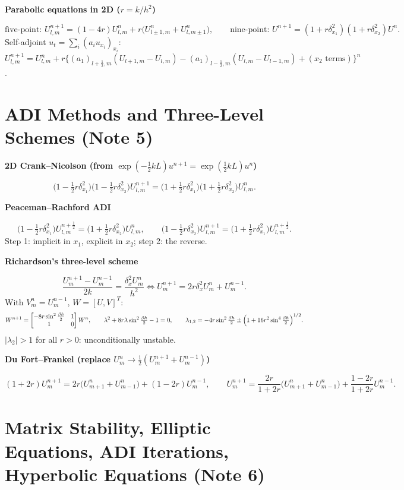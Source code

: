 \documentclass[10pt,a4paper]{article}
\newcommand{\head}[1]{\par\smallskip\noindent\textbf{\color{blue!50!black}#1}\par\nobreak}
\begin{document}
\head{Parabolic equations in 2D (\(r=k/h^2\))}
\[
  \text{five-point: } U_{l,m}^{n+1}=(1-4r)U_{l,m}^n+r\bigl(U_{l\pm1,m}^n+U_{l,m\pm1}^n\bigr),
  \qquad
  \text{nine-point: } U^{n+1}=(1+r\delta_{x_1}^2)(1+r\delta_{x_2}^2)U^n .
\]
Self-adjoint \(u_t=\sum_i(a_iu_{x_i})_{x_i}\):
\(U^{n+1}_{l,m}=U^n_{l,m}+r\bigl\{(a_1)_{l+\frac12,m}(U_{l+1,m}-U_{l,m})-(a_1)_{l-\frac12,m}(U_{l,m}-U_{l-1,m})+(x_2\text{ terms})\bigr\}^n\).

\section{ADI Methods and Three-Level Schemes (Note 5)}

\head{2D Crank--Nicolson (from \(\exp(-\frac12kL)u^{n+1}=\exp(\frac12kL)u^n\))}
\[
  \bigl(1-\tfrac12r\delta_{x_1}^2\bigr)\bigl(1-\tfrac12r\delta_{x_2}^2\bigr)U_{l,m}^{n+1}
  =\bigl(1+\tfrac12r\delta_{x_1}^2\bigr)\bigl(1+\tfrac12r\delta_{x_2}^2\bigr)U_{l,m}^n .
\]

\head{Peaceman--Rachford ADI}
\[
  \bigl(1-\tfrac12r\delta_{x_1}^2\bigr)U_{l,m}^{n+\frac12}=\bigl(1+\tfrac12r\delta_{x_2}^2\bigr)U_{l,m}^n,
  \qquad
  \bigl(1-\tfrac12r\delta_{x_2}^2\bigr)U_{l,m}^{n+1}=\bigl(1+\tfrac12r\delta_{x_1}^2\bigr)U_{l,m}^{n+\frac12}.
\]
Step 1: implicit in \(x_1\), explicit in \(x_2\); step 2: the reverse.

\head{Richardson's three-level scheme}
\[
  \frac{U_m^{n+1}-U_m^{n-1}}{2k}=\frac{\delta_x^2U_m^n}{h^2}
  \iff
  U_m^{n+1}=2r\delta_x^2U_m^n+U_m^{n-1}.
\]
With \(V_m^n=U_m^{n-1}\), \(W=[U,V]^T\):
\[
  W^{n+1}=\begin{bmatrix}-8r\sin^2\frac{\beta h}2&1\\1&0\end{bmatrix}W^n,
  \qquad
  \lambda^2+8r\lambda\sin^2\tfrac{\beta h}2-1=0,
  \qquad
  \lambda_{1,2}=-4r\sin^2\tfrac{\beta h}2\pm\Bigl(1+16r^2\sin^4\tfrac{\beta h}2\Bigr)^{1/2}.
\]
\(|\lambda_2|>1\) for all \(r>0\): unconditionally unstable.

\head{Du Fort--Frankel (replace \(U_m^n\to\frac12(U_m^{n+1}+U_m^{n-1})\))}
\[
  (1+2r)U_m^{n+1}=2r\bigl(U_{m+1}^n+U_{m-1}^n\bigr)+(1-2r)U_m^{n-1},
  \qquad
  U_m^{n+1}=\frac{2r}{1+2r}\bigl(U_{m+1}^n+U_{m-1}^n\bigr)+\frac{1-2r}{1+2r}U_m^{n-1}.
\]

\section{Matrix Stability, Elliptic Equations, ADI Iterations, Hyperbolic Equations (Note 6)}
\end{document}
